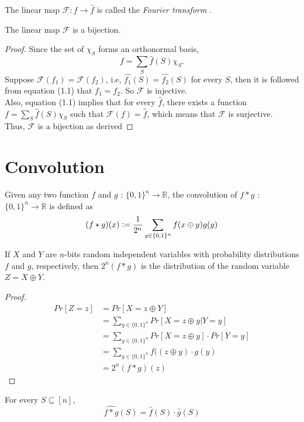 The linear map $\mathcal{F} : f \rightarrow \widehat{f}$ is called the \textit{Fourier transform }.

\begin{theorem}
The linear map $\mathcal{F}$ is a bijection.
\end{theorem} 

\begin{proof}
Since the set of $\chi_S$ forms an orthonormal basis, 
\begin{equation}
f = \sum \limits_{S} \widehat{f}(S) \chi_S.
\end{equation}
Suppose $\mathcal{F}(f_1) = \mathcal{F}(f_2)$, i.e, $\widehat{f_1}(S) = \widehat{f_2}(S)$ for every $S$, then it is followed from equation (1.1) that $f_1 = f_2$. So $\mathcal{F}$ is injective. \\
Also, equation (1.1) implies that for every $\widehat{f}$, there exists a function $f = \sum \limits_{S} \widehat{f}(S) \chi_S $ such that $\mathcal{F}(f) = \widehat{f}$, which means that $\mathcal{F}$ is surjective. \\
Thus, $\mathcal{F}$ is a bijection as derived 
\end{proof}

\section{Convolution}
\begin{definition}
Given any two function $f$ and $g$ : $\{ 0,1 \}^n \rightarrow \mathbb{R}$, the convolution of $f*g$ :  $\{ 0,1 \}^n \rightarrow \mathbb{R}$ is defined as
$$(f*g)(x) \vcentcolon= \frac{1}{2^n} \sum\limits_{y \in \{0,1\}^n} f(x \oplus y) g(y)$$
\end{definition}

\begin{theorem}
If $X$ and $Y$ are $n$-bits random independent variables with probability distributions $f$ and $g$, respectively, then $2^n(f*g)$ is the distribution of the random variable $Z = X \oplus Y$.
\end{theorem}

\begin{proof}

\begin{align*}
Pr[Z = z] 
& = Pr[X = z \oplus Y] \\
& = \sum\limits_{y \in \{0,1\}^n} Pr[X = z \oplus y | Y = y] 	 \\
& = \sum\limits_{y \in \{0,1\}^n} Pr[X = z \oplus y] \cdot Pr[Y =y] \\
& = \sum\limits_{y \in \{0,1\}^n} f((z \oplus y) \cdot g(y) \\
& = 2^n (f *g)(z)
\end{align*}
\end{proof}
\begin{theorem}
For every $S \subseteq [n]$, 
$$\widehat{f*g}(S) = \widehat{f}(S) \cdot \widehat{g}(S)$$
\end{theorem}

